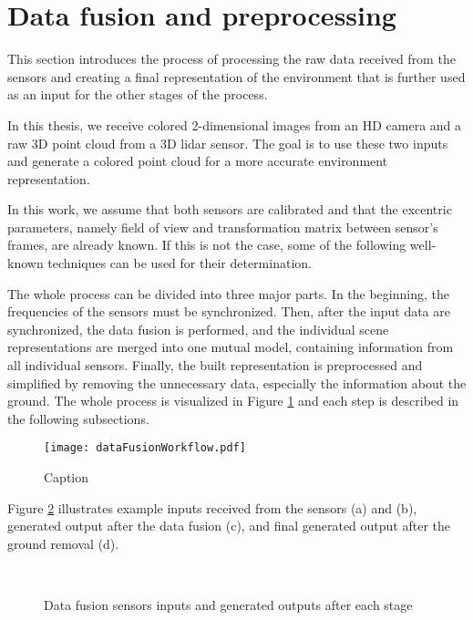 \section{Data fusion and preprocessing}\label{section:fusion}

This section introduces the process of processing the raw data received from the sensors and creating a final representation of the environment that is further used as an input for the other stages of the process.\par
In this thesis, we receive colored 2-dimensional images from an HD camera and a raw 3D point cloud from a 3D lidar sensor. The goal is to use these two inputs and generate a colored point cloud for a more accurate environment representation.\par
In this work, we assume that both sensors are calibrated and that the excentric parameters, namely field of view and transformation matrix between sensor's frames, are already known. If this is not the case, some of the following well-known techniques \cite{Calibration1} \cite{Calibration2} can be used for their determination.\par
The whole process can be divided into three major parts. In the beginning, the frequencies of the sensors must be synchronized. Then, after the input data are synchronized, the data fusion is performed, and the individual scene representations are merged into one mutual model, containing information from all individual sensors. Finally, the built representation is preprocessed and simplified by removing the unnecessary data, especially the information about the ground. The whole process is visualized in Figure \ref{fig:dataFusionWorkflow} and each step is described in the following subsections.

\begin{figure}[htpb]
    \centering
    \texttt{[image: dataFusionWorkflow.pdf]}
    \caption{Caption} \label{fig:dataFusionWorkflow}
\end{figure}

Figure \ref{fig:dataFusionExample} illustrates example inputs received from the sensors (a) and (b), generated output after the data fusion (c), and final generated output after the ground removal (d).

\begin{figure}[!tbp]
    \centering
    \hfill
    \\
    \hfill
    \caption{Data fusion sensors inputs and generated outputs after each stage}
    \label{fig:dataFusionExample}
\end{figure}

